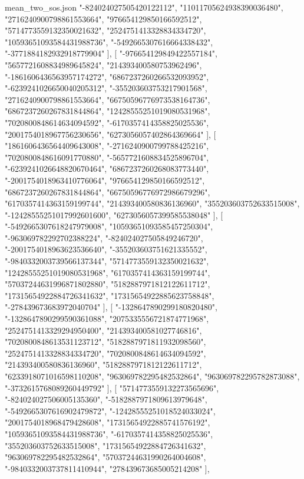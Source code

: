 \begin{filecontents*}[overwrite]{mean_two_sos.json}
    "-824024027505420122112",
    "11011705624938390036480",
    "2716240900798861553664",
    "976654129850166592512",
    "5714773559132350021632",
    "2524751413328834334720",
    "10593651093584431988736",
    "-5492665307616664338432",
    "-3771884182932918779904"
   ],
   [
    "-976654129849422557184",
    "5657721608834989645824",
    "214393400580753962496",
    "-1861606436563957174272",
    "6867237260266532093952",
    "-6239241026650040205312",
    "-355203603753217901568",
    "2716240900798861553664",
    "66750596776973538164736",
    "6867237260267831844864",
    "12428555251019080531968",
    "7020800848614634094592",
    "-6170357414358825025536",
    "2001754018967756230656",
    "6273056057402864369664"
   ],
   [
    "1861606436564409643008",
    "-2716240900799788425216",
    "7020800848616091770880",
    "-5657721608834525896704",
    "-6239241026648820670464",
    "6867237260268083773440",
    "-2001754018963410776064",
    "976654129850166592512",
    "6867237260267831844864",
    "66750596776972986679296",
    "6170357414363159199744",
    "214393400580836136960",
    "355203603752633515008",
    "-12428555251017992601600",
    "6273056057399585538048"
   ],
   [
    "-5492665307618247979008",
    "10593651093585457250304",
    "-963069782292702388224",
    "-824024027505849246720",
    "-2001754018963623536640",
    "-355203603751621335552",
    "-9840332003739566137344",
    "5714773559132350021632",
    "12428555251019080531968",
    "6170357414363159199744",
    "57037244631996871802880",
    "5182887971812122611712",
    "17315654922884726341632",
    "17315654922885623758848",
    "-278439673683972040704"
   ],
   [
    "-1328647890299180820480",
    "-1328647890299590361088",
    "2075335556721874771968",
    "2524751413329294950400",
    "214393400581027746816",
    "7020800848613531123712",
    "5182887971811932098560",
    "2524751413328834334720",
    "7020800848614634094592",
    "214393400580836136960",
    "5182887971812122611712",
    "6233918071016598110208",
    "963069782295482532864",
    "963069782295782873088",
    "-3732615768089260449792"
   ],
   [
    "5714773559132273565696",
    "-824024027506005135360",
    "-5182887971809613979648",
    "-5492665307616902479872",
    "-12428555251018524033024",
    "2001754018968479428608",
    "17315654922885741576192",
    "10593651093584431988736",
    "-6170357414358825025536",
    "355203603752633515008",
    "17315654922884726341632",
    "963069782295482532864",
    "57037244631990264004608",
    "-9840332003737811410944",
    "278439673685005214208"
   ],

\end{filecontents*}
